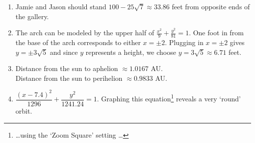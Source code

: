 \begin{enumerate}
\setcounter{enumi}{\value{HW}}

\item  Jamie and Jason should stand $100-25\sqrt{7} \approx 33.86$ feet from opposite ends of the gallery.

\item  The arch can be modeled by the upper half of $\frac{x^2}{9} + \frac{y^2}{81} = 1$.  One foot in from the base of the arch corresponds to either $x = \pm 2$.  Plugging in $x = \pm 2$ gives $y = \pm 3\sqrt{5}$ and since $y$ represents a height, we choose $y=3\sqrt{5} \approx 6.71$ feet. 

\item Distance from the sun to aphelion $\approx 1.0167$ AU.\\
Distance from the sun to perihelion $\approx 0.9833$ AU.

\item  $\dfrac{(x-7.4)^2}{1296} + \dfrac{y^2}{1241.24} = 1$.  Graphing this equation\footnote{\ldots using the `Zoom Square' setting \ldots} reveals a very `round' orbit.

\end{enumerate}
